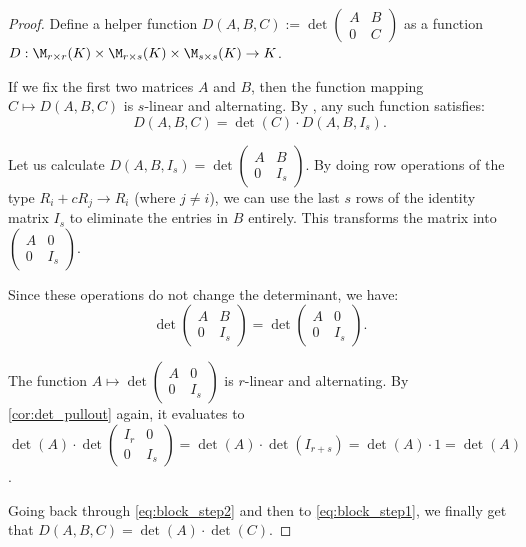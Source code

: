 \begin{proof}
  Define a helper function $D(A, B, C) := \det \left(\begin{smallmatrix} A & B \\ 0 & C \end{smallmatrix}\right)$ as a function $D : \M_{r \times r}(K) \times \M_{r \times s}(K) \times \M_{s \times s}(K) \to K$.

  If we fix the first two matrices $A$ and $B$, then the function mapping $C \mapsto D(A, B, C)$ is $s$-linear and alternating. By , any such function satisfies:
  \begin{equation} \label{eq:block_step1}
    D(A, B, C) = \det(C) \cdot D(A, B, I_s).
  \end{equation}

  Let us calculate $D(A, B, I_s) = \det \left ( \begin{smallmatrix} A & B \\ 0 & I_s \end{smallmatrix}\right)$. By doing row operations of the type $R_i + c R_j \to R_i$ (where $j \neq i$), we can use the last $s$ rows of the identity matrix $I_s$ to eliminate the entries in $B$ entirely. This transforms the matrix into $\left(\begin{smallmatrix} A & 0 \\ 0 & I_s \end{smallmatrix}\right)$.

  Since these operations do not change the determinant, we have:
  \begin{equation} \label{eq:block_step2}
    \det \begin{pmatrix} A & B \\ 0 & I_s \end{pmatrix} = \det \begin{pmatrix} A & 0 \\ 0 & I_s \end{pmatrix}.
  \end{equation}

  The function $A \mapsto \det \left(\begin{smallmatrix} A & 0 \\ 0 & I_s \end{smallmatrix}\right)$ is $r$-linear and alternating. By \cref{cor:det_pullout} again, it evaluates to $\det(A) \cdot \det \left(\begin{smallmatrix} I_r & 0 \\ 0 & I_s \end{smallmatrix}\right) = \det(A) \cdot \det(I_{r+s}) = \det(A) \cdot 1 = \det(A)$.

  Going back through \eqref{eq:block_step2} and then to \eqref{eq:block_step1}, we finally get that $D(A, B, C) = \det(A) \cdot \det(C)$.
\end{proof}

